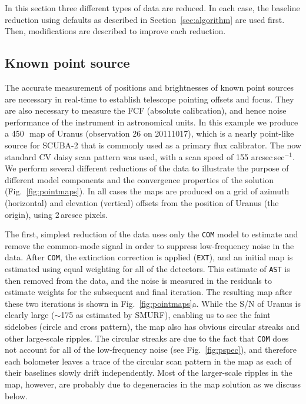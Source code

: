 \documentclass[useAMS,usenatbib,nofootinbib]{mn2e}
\newcommand{\model}[1]{\texttt{#1}}
\begin{document}
In this section three different types of data are reduced. In each
case, the baseline reduction using defaults as described in
Section~\ref{sec:algorithm} are used first. Then, modifications are
described to improve each reduction.

\subsection{Known point source}
\label{sec:point}

The accurate measurement of positions and brightnesses of known point
sources are necessary in real-time to establish telescope pointing
offsets and focus. They are also necessary to measure the FCF
(absolute calibration), and hence noise performance of the instrument
in astronomical units.  In this example we produce a 450\,\micron\ map
of Uranus (observation 26 on 20111017), which is a nearly point-like
source for SCUBA-2 that is commonly used as a primary flux
calibrator. The now standard CV daisy scan pattern was used, with a
scan speed of 155 arcsec\,sec$^{-1}$. We perform several different
reductions of the data to illustrate the purpose of different model
components and the convergence properties of the solution
(Fig.~\ref{fig:pointmaps}). In all cases the maps are produced on a
grid of azimuth (horizontal) and elevation (vertical) offsets from the
position of Uranus (the origin), using 2\,arcsec pixels.

The first, simplest reduction of the data uses only the \model{COM}
model to estimate and remove the common-mode signal in order to
suppress low-frequency noise in the data. After \model{COM}, the
extinction correction is applied (\model{EXT}), and an initial map is
estimated using equal weighting for all of the detectors. This
estimate of \model{AST} is then removed from the data, and the noise
is measured in the residuals to estimate weights for the subsequent
and final iteration. The resulting map after these two iterations is
shown in Fig.~\ref{fig:pointmaps}a. While the S/N of Uranus is clearly
large ($\sim$175 as estimated by SMURF), enabling us to see the faint
sidelobes (circle and cross pattern), the map also has obvious
circular streaks and other large-scale ripples. The circular streaks
are due to the fact that \model{COM} does not account for all of the
low-frequency noise (see Fig.~\ref{fig:pspec}), and therefore each
bolometer leaves a trace of the circular scan pattern in the map as
each of their baselines slowly drift independently. Most of the
larger-scale ripples in the map, however, are probably due to
degeneracies in the map solution as we discuss below.
\end{document}
